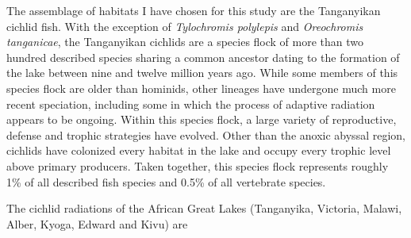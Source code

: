 The assemblage of habitats I have chosen for this study are the Tanganyikan cichlid fish. With the exception of {\em Tylochromis polylepis} and {\em Oreochromis tanganicae}, the Tanganyikan cichlids are a species flock of more than two hundred described species sharing a common ancestor dating to the formation of the lake between nine and twelve million years ago. While some members of this species flock are older than hominids, other lineages have undergone much more recent speciation, including some in which the process of adaptive radiation appears to be ongoing. Within this species flock, a large variety of reproductive, defense and trophic strategies have evolved. Other than the anoxic abyssal region, cichlids have colonized every habitat in the lake and occupy every trophic level above primary producers. Taken together, this species flock represents roughly 1\% of all described fish species and 0.5\% of all vertebrate species.

The cichlid radiations of the African Great Lakes (Tanganyika, Victoria, Malawi, Alber, Kyoga, Edward and Kivu) are 